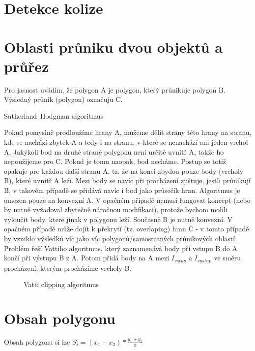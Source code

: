 \documentclass[a4paper,12pt]{book}
\begin{document}
\section{Detekce kolize}
\section{Oblasti průniku dvou objektů a průřez}

Pro jasnost uvádím, že polygon A je polygon, který průnikuje polygon B. Výsledný průnik (polygon) označuju C.

Sutherland–Hodgman algoritmus


Pokud pomyslně prodloužíme hrany A, můžeme dělit strany této hrany na stranu, kde se nachází zbytek A a tedy i na stranu, v které se nenachází ani jeden vrchol A. Jakýkoli bod na  druhé straně polygonu není určitě uvnitř A, takže ho nepoužijeme pro C. Pokud je tomu naopak, bod necháme. Postup se totiž opakuje pro každou další stranu A, tz. že na konci zbydou pouze body (vrcholy B), které uvnitř A leží. Mezi body se navíc při procházení zjištuje, jestli průnikují B, v takovém případě se přidává navíc i bod jako průsečík hran. Algoritmus je omezen pouze na konvexní A. V opačném případě nemusí fungovat koncept (nebo by nutně vyžadoval zbytečně náročnou modifikaci), protože bychom mohli vyloučit body, které jinak v polygonu leží. Současně B je nutně konvexní. V opačném případě může dojít k překrytí (tz. overlaping) hran C - v tomto případě by vzniklo výsledků víc jako víc polygonů/samostatných průnikových oblastí. Problém řeší Vattiho algoritmus, který zaznamenává body při vstupu B do A končí při výstupu B z A. Potom přidá body na A mezi $I_{vstup}$ a $I_{vystup}$ ve směru procházení, kterým procházíme vrcholy B.




\begin{figure}[H]
  \centering
  
  \caption{Vatti clipping algoritmus}
\end{figure}



\section{Obsah polygonu}

Obsah polygonu si lze
$S_i = (x_1-x_2)*\frac{y_1+y_2}{2}$
\end{document}
